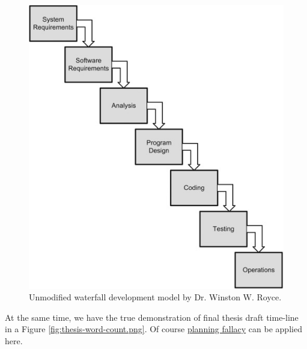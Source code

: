 \begin{figure}[H]
    \centering
    \includegraphics[scale=0.9]{Figures/Unmodified-Waterfall-Development-Model.jpg}
    \caption[Unmodified-Waterfall-Development-Model]{Unmodified waterfall development model by Dr. Winston W. Royce. \cite{Unmodified-Waterfall-Development-Model}}
    \label{fig:Unmodified-Waterfall-Development-Model.jpg}
\end{figure}

\par At the same time, we have the true demonstration of final thesis draft time-line in a Figure \ref{fig:thesis-word-count.png}. Of course  \href{https://www.lesswrong.com/posts/CPm5LTwHrvBJCa9h5/planning-fallacy}{planning fallacy} can be applied here.


